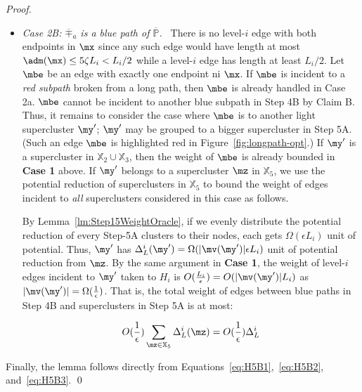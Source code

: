 \begin{proof}
\begin{itemize}
	\item \emph{Case 2B: $\overline{\mp}_a$ is a blue path of $\overline{\mathbb{P}}$.~} There is no level-$i$ edge with both endpoints in $\mx$ since any such edge would have length at most $\adm(\mx)\leq 5\zeta L_i  < L_i/2$ while a level-$i$ edge has length at least $L_i/2$. Let $\mbe$ be an edge with exactly one endpoint ni $\mx$. If $\mbe$ is incident to a \emph{red subpath} broken from a long path, then $\mbe$ is already handled in Case 2a. $\mbe$ cannot be incident to another blue subpath in Step 4B by Claim B. Thus, it remains to consider the case where $\mbe$ is to another light supercluster $\my'$; $\my'$ may be grouped to a bigger supercluster in Step 5A. (Such an edge $\mbe$ is highlighted red in Figure~\ref{fig:longpath-opt}.) If $\my'$ is a supercluster in $\mathbb{X}_2\cup \mathbb{X}_3$, then the weight of $\mbe$ is already bounded in \textbf{Case 1 } above. If $\my'$ belongs to a supercluster $\mz$ in $\mathbb{X}_5$, we use the potential reduction of superclusters in $\mathbb{X}_5$ to bound the weight of edges  incident to \emph{all} superclusters considered in this case as follows.
	
	By Lemma~\ref{lm:Step15WeightOracle}, if we evenly distribute the potential reduction of every Step-5A clusters to their nodes, each gets $\Omega(\epsilon L_i)$ unit of potential. Thus, $\my'$ has $\Delta^i_{L}(\my') = \Omega(|\mv(\my')|
	\epsilon L_i)$ unit of potential reduction from $\mz$. By the same argument in \textbf{Case 1}, the weight of level-$i$ edges incident to  $\my'$ taken to $H_i$ is  $O(\frac{L_i}{\epsilon}) = O(|\mv(\my')|L_i)$ as $|\mv(\my')| = \Omega(\frac{1}{\epsilon})$. That is, the total weight of edges between blue paths in Step 4B and superclusters in Step 5A is at most:
	
	\begin{equation}\label{eq:H5B2}
	O(\frac{1}{\epsilon}) \sum_{\mz \in \mathbb{X}_5}\Delta^i_{L}(\mz) = O(\frac{1}{\epsilon})\Delta^i_{L} 	
	\end{equation}
\end{itemize}


	
Finally, the lemma follows directly from Equations~\eqref{eq:H5B1},~\eqref{eq:H5B2}, and~\eqref{eq:H5B3}.  \qed
\end{proof}

